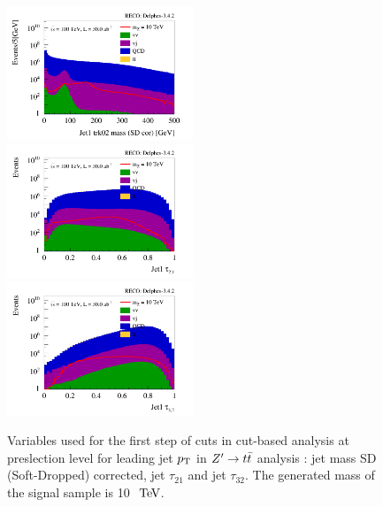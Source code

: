 \documentclass{cernrep}
\begin{document}
\begin{figure}[!htb]\centering
\includegraphics[width=0.495\textwidth]{Fig/Zptt/cut/Jet1_trk02_SD_Cor_m_sel0_nostack_log.png}
\includegraphics[width=0.495\textwidth]{Fig/Zptt/cut/Jet1_tau21_sel0_nostack_log.png}
\includegraphics[width=0.495\textwidth]{Fig/Zptt/cut/Jet1_tau32_sel0_nostack_log.png}
\caption{Variables used for the first step of cuts in cut-based analysis at preslection level for leading jet $p\sb{\scriptstyle\mathrm{T}}$ in $Z^{\prime} \rightarrow t\bar{t}$ analysis : jet mass SD (Soft-Dropped) corrected, jet $\tau_{21}$ and jet $\tau_{32}$. The generated mass of the signal sample is 10 $\TeV$.}
\label{fig:Zptt_sel0_cut}
\end{figure}
\end{document}
